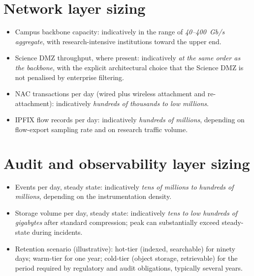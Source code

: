 \section{Network layer sizing}
\label{sec:sz-network}

\begin{itemize}[leftmargin=1.5em,nosep]
  \item Campus backbone capacity: indicatively in the range of
    \emph{40--400~Gb/s aggregate}, with research-intensive
    institutions toward the upper end.
  \item Science DMZ throughput, where present: indicatively
    \emph{at the same order as the backbone}, with the explicit
    architectural choice that the Science DMZ is not penalised by
    enterprise filtering.
  \item NAC transactions per day (wired plus wireless attachment
    and re-attachment): indicatively \emph{hundreds of thousands
    to low millions}.
  \item IPFIX flow records per day: indicatively \emph{hundreds of
    millions}, depending on flow-export sampling rate and on
    research traffic volume.
\end{itemize}

\section{Audit and observability layer sizing}
\label{sec:sz-audit}

\begin{itemize}[leftmargin=1.5em,nosep]
  \item Events per day, steady state: indicatively \emph{tens of
    millions to hundreds of millions}, depending on the
    instrumentation density.
  \item Storage volume per day, steady state: indicatively
    \emph{tens to low hundreds of gigabytes} after standard
    compression; peak can substantially exceed steady-state during
    incidents.
  \item Retention scenario (illustrative): hot-tier (indexed,
    searchable) for ninety days; warm-tier for one year;
    cold-tier (object storage, retrievable) for the period required
    by regulatory and audit obligations, typically several years.
\end{itemize}

